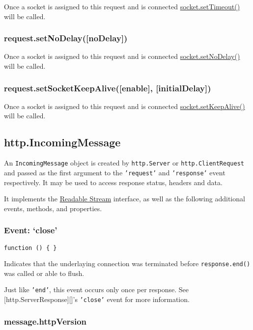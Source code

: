 Once a socket is assigned to this request and is connected
\href{net.html\#net\_socket\_settimeout\_timeout\_callback}{socket.setTimeout()}
will be called.

\subsubsection{request.setNoDelay({[}noDelay{]})}

Once a socket is assigned to this request and is connected
\href{net.html\#net\_socket\_setnodelay\_nodelay}{socket.setNoDelay()}
will be called.

\subsubsection{request.setSocketKeepAlive({[}enable{]},
{[}initialDelay{]})}

Once a socket is assigned to this request and is connected
\href{net.html\#net\_socket\_setkeepalive\_enable\_initialdelay}{socket.setKeepAlive()}
will be called.

\subsection{http.IncomingMessage}

An \texttt{IncomingMessage} object is created by \texttt{http.Server} or
\texttt{http.ClientRequest} and passed as the first argument to the
\texttt{'request'} and \texttt{'response'} event respectively. It may be
used to access response status, headers and data.

It implements the \href{stream.html\#stream\_readable\_stream}{Readable
Stream} interface, as well as the following additional events, methods,
and properties.

\subsubsection{Event: `close'}

\texttt{function () \{ \}}

Indicates that the underlaying connection was terminated before
\texttt{response.end()} was called or able to flush.

Just like \texttt{'end'}, this event occurs only once per response. See
{[}http.ServerResponse{]}{[}{]}'s \texttt{'close'} event for more
information.

\subsubsection{message.httpVersion}

